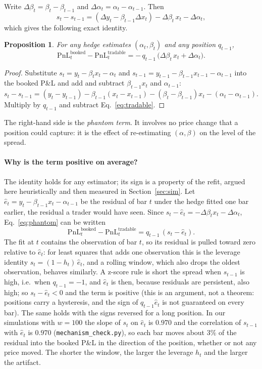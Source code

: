 \documentclass[11pt]{article}
\newtheorem{proposition}{Proposition}
\theoremstyle{remark}
\begin{document}
Write $\Delta\beta_t=\beta_t-\beta_{t-1}$ and $\Delta\alpha_t=\alpha_t-\alpha_{t-1}$. Then
\begin{equation}
s_t - s_{t-1} = (\Delta y_t - \beta_{t-1}\Delta x_t) - \Delta\beta_t\, x_t - \Delta\alpha_t,
\end{equation}
which gives the following exact identity.
\begin{proposition}\label{prop:phantom}
For any hedge estimates $(\alpha_t,\beta_t)$ and any position $q_{t-1}$,
\begin{equation}
\text{PnL}_t^{\text{booked}} - \text{PnL}_t^{\text{tradable}} = -\,q_{t-1}\,\bigl(\Delta\beta_t\, x_t + \Delta\alpha_t\bigr).
\label{eq:phantom}
\end{equation}
\end{proposition}
\begin{proof}
Substitute $s_t=y_t-\beta_t x_t-\alpha_t$ and $s_{t-1}=y_{t-1}-\beta_{t-1}x_{t-1}-\alpha_{t-1}$ into the booked P\&L and
add and subtract $\beta_{t-1}x_t$ and $\alpha_{t-1}$:
$s_t-s_{t-1}=(y_t-y_{t-1})-\beta_{t-1}(x_t-x_{t-1})-(\beta_t-\beta_{t-1})x_t-(\alpha_t-\alpha_{t-1})$.
Multiply by $q_{t-1}$ and subtract Eq.~\eqref{eq:tradable}.
\end{proof}
The right-hand side is the \emph{phantom term}. It involves no price change that a position could capture: it is
the effect of re-estimating $(\alpha,\beta)$ on the level of the spread.

\paragraph{Why is the term positive on average?} The identity holds for any estimator; its sign is a property of the
refit, argued here heuristically and then measured in Section~\ref{sec:sim}. Let $\hat e_t=y_t-\beta_{t-1}x_t-\alpha_{t-1}$ be the residual of bar $t$ under the
hedge fitted one bar earlier, the residual a trader would have seen. Since $s_t-\hat e_t=-\Delta\beta_t x_t-\Delta\alpha_t$,
Eq.~\eqref{eq:phantom} can be written
\begin{equation}
\text{PnL}_t^{\text{booked}} - \text{PnL}_t^{\text{tradable}} = q_{t-1}\,(s_t-\hat e_t).
\end{equation}
The fit at $t$ contains the observation of bar $t$, so its residual is pulled toward zero relative to $\hat e_t$: for least
squares that adds one observation this is the leverage identity $s_t=(1-h_t)\,\hat e_t$, and a rolling window, which also
drops the oldest observation, behaves similarly. A z-score rule is short the spread when $s_{t-1}$ is high, i.e.\ when
$q_{t-1}=-1$, and $\hat e_t$ is then, because residuals are persistent, also high; so $s_t-\hat e_t<0$ and the term is
positive (this is an argument, not a theorem: positions carry a hysteresis, and the sign of $q_{t-1}\hat e_t$ is not
guaranteed on every bar). The same holds with the signs reversed for a long position. In our simulations with $w=100$ the slope of $s_t$ on
$\hat e_t$ is $0.970$ and the correlation of $s_{t-1}$ with $\hat e_t$ is $0.970$ (\texttt{mechanism\_check.py}), so each bar
moves about $3\%$ of the residual into the booked P\&L in the direction of the position, whether or not any price moved.
The shorter the window, the larger the leverage $h_t$ and the larger the artifact.
\end{document}
